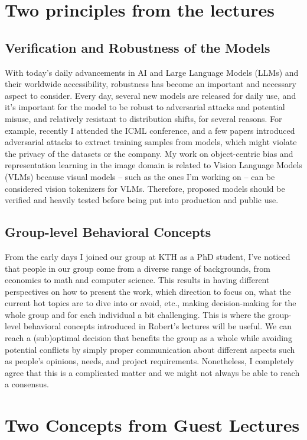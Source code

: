 \documentclass[11pt]{article}
\begin{document}
\section{Two principles from the lectures}

\subsection{Verification and Robustness of the Models}
\label{sec:robustness}
With today's daily advancements in AI and Large Language Models (LLMs) and their worldwide accessibility, robustness has become an important and necessary aspect to consider. Every day, several new models are released for daily use, and it's important for the model to be robust to adversarial attacks and potential misuse, and relatively resistant to distribution shifts, for several reasons. For example, recently I attended the ICML conference, and a few papers introduced adversarial attacks to extract training samples from models, which might violate the privacy of the datasets or the company. My work on object-centric bias and representation learning in the image domain is related to Vision Language Models (VLMs) because visual models -- such as the ones I'm working on -- can be considered vision tokenizers for VLMs. Therefore, proposed models should be verified and heavily tested before being put into production and public use.

\subsection{Group-level Behavioral Concepts}
From the early days I joined our group at KTH as a PhD student, I've noticed that people in our group come from a diverse range of backgrounds, from economics to math and computer science. This results in having different perspectives on how to present the work, which direction to focus on, what the current hot topics are to dive into or avoid, etc., making decision-making for the whole group and for each individual a bit challenging. This is where the group-level behavioral concepts introduced in Robert's lectures will be useful. We can reach a (sub)optimal decision that benefits the group as a whole while avoiding potential conflicts by simply proper communication about different aspects such as people's opinions, needs, and project requirements. Nonetheless, I completely agree that this is a complicated matter and we might not always be able to reach a consensus.

\section{Two Concepts from Guest Lectures}
\end{document}

